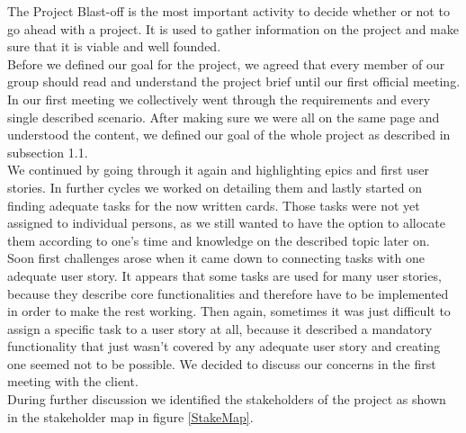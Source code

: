 The Project Blast-off is the most important activity to decide whether or not to go ahead with a project. It is used to gather information on the project and make sure that it is viable and well founded. \\ 
Before we defined our goal for the project, we agreed that every member of our group should read and understand the project brief until our first official meeting. In our first meeting we collectively went through the requirements and every single described scenario. After making sure we were all on the same page and understood the content, we defined our goal of the whole project as described in subsection 1.1. \\ 
We continued by going through it again and highlighting epics and first user stories. In further cycles we worked on detailing them and lastly started on finding adequate tasks for the now written cards. Those tasks were not yet assigned to individual persons, as we still wanted to have the option to allocate them according to one’s time and knowledge on the described topic later on. Soon first challenges arose when it came down to connecting tasks with one adequate user story. It appears that some tasks are used for many user stories, because they describe core functionalities and therefore have to be implemented in order to make the rest working. Then again, sometimes it was just difficult to assign a specific task to a user story at all, because it described a mandatory functionality that just wasn’t covered by any adequate user story and creating one seemed not to be possible. We decided to discuss our concerns in the first meeting with the client.\\ 
During further discussion we identified the stakeholders of the project as shown in the stakeholder map in figure \ref{StakeMap}. \\ 

\newpage

